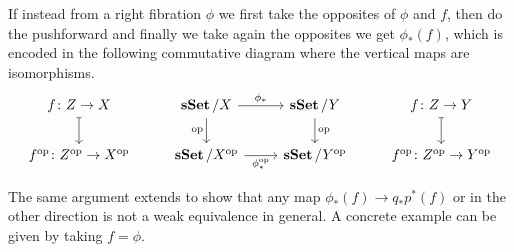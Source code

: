 \documentclass[a4paper,fontsize=12pt]{scrartcl}
\begin{document}
If instead from a right fibration $\phi$ we first take the opposites of $\phi$
and $f$, then do the pushforward and finally we take again the opposites we get
$\phi_*(f)$, which is encoded in the following commutative diagram where the
vertical maps are isomorphisms.
\[\begin{tikzcd}
	{f\colon Z\rightarrow X} & {\sSet/X} & {\sSet/Y} & {f\colon Z\rightarrow Y} \\
	{f^{\op}\colon Z^{\op}\rightarrow X^{\op}} & {\sSet/X^{\op}} & {\sSet/Y^{\op}} & {f^{\op}\colon Z^{\op}\rightarrow Y^{\op}}
	\arrow["\op", from=1-3, to=2-3]
	\arrow["\op"', from=1-2, to=2-2]
	\arrow["{\phi^{\op}_*}"', from=2-2, to=2-3]
	\arrow["{\phi_*}", from=1-2, to=1-3]
	\arrow[maps to, from=1-1, to=2-1]
	\arrow[maps to, from=1-4, to=2-4]
\end{tikzcd}\]

The same argument extends to show that any map $\phi_*(f)\rightarrow q_*p^*(f)$
or in the other direction is not a weak equivalence in general. A concrete
example can be given by taking $f=\phi$.


\printbibliography
\end{document}
